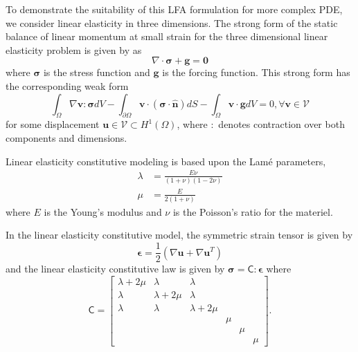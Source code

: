 \documentclass[review]{siamart190516}
\begin{document}
To demonstrate the suitability of this LFA formulation for more complex PDE, we consider linear elasticity in three dimensions.
The strong form of the static balance of linear momentum at small strain for the three dimensional linear elasticity problem is given by \cite{hughes2012finite} as
\begin{equation}
\nabla \cdot \boldsymbol{\sigma} + \boldsymbol{g} = \boldsymbol{0}
\end{equation}
where $\boldsymbol{\sigma}$ is the stress function and $\boldsymbol{g}$ is the forcing function.
This strong form has the corresponding weak form
\begin{equation}
\int_{\Omega} \nabla \mathbf{v} : \boldsymbol{\sigma} dV - \int_{\partial \Omega} \mathbf{v} \cdot \left( \boldsymbol{\sigma} \cdot \hat{\mathbf{n}} \right) dS - \int_{\Omega} \mathbf{v} \cdot \mathbf{g} dV = 0, \forall \mathbf{v} \in \mathcal{V}
\end{equation}
for some displacement $\mathbf{u} \in \mathcal{V} \subset H^1 \left( \Omega \right)$, where $:$ denotes contraction over both components and dimensions.

Linear elasticity constitutive modeling is based upon the Lamé parameters,
\begin{equation}
\begin{split}
\lambda & = \frac{E \nu}{\left( 1 + \nu \right) \left( 1 - 2 \nu \right)} \\
\mu & = \frac{E}{2 \left( 1 + \nu \right)}
\end{split}
\end{equation}
where $E$ is the Young's modulus and $\nu$ is the Poisson's ratio for the materiel.

In the linear elasticity constitutive model, the symmetric strain tensor is given by
\begin{equation}
\boldsymbol{\epsilon} = \frac{1}{2} \left( \nabla \mathbf{u} + \nabla \mathbf{u}^T \right)
\end{equation}
and the linear elasticity constitutive law is given by $\boldsymbol{\sigma} = \mathsf{C} : \boldsymbol{\epsilon}$ where
\begin{equation}
\mathsf{C} =
\begin{bmatrix}
   \lambda + 2\mu & \lambda & \lambda & & & \\
   \lambda & \lambda + 2\mu & \lambda & & & \\
   \lambda & \lambda & \lambda + 2\mu & & & \\
   & & & \mu & & \\
   & & & & \mu & \\
   & & & & & \mu
\end{bmatrix}.
\end{equation}
\end{document}
